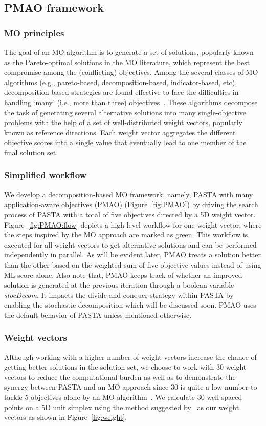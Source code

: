 \subsection{PMAO framework}
\subsubsection{MO principles}
The goal of an MO algorithm is to generate a set of solutions, popularly known as the Pareto-optimal solutions in the MO literature, which represent the best compromise among the (conflicting) objectives. 
Among the several classes of MO algorithms (e.g., pareto-based, decomposition-based, indicator-based, etc), decomposition-based strategies are found effective to face the difficulties in handling `many' (i.e., more than three) objectives~\cite{li2015many}. These algorithms decompose the task of generating several alternative solutions into many single-objective problems with the help of a set of well-distributed weight vectors, popularly known as reference directions. Each weight vector aggregates the different objective scores into a single value that eventually lead to one member of the final solution set.

\subsubsection{Simplified workflow}
We develop a decomposition-based MO framework, namely, PASTA with many application-aware objectives (PMAO) (Figure~\ref{fig:PMAO}) by driving the search process of PASTA with a total of five objectives directed by a 5D weight vector. Figure~\ref{fig:PMAO:flow} depicts a high-level workflow for one weight vector, where the steps inspired by the MO approach are marked as green. This workflow is executed for all weight vectors to get alternative solutions and can be performed independently in parallel. As will be evident later, PMAO treats a solution better than the other based on the weighted-sum of five objective values instead of using ML score alone. Also note that, PMAO keeps track of whether an improved solution is generated at the previous iteration through a boolean variable \textit{stocDecom}. It impacts the divide-and-conquer strategy within PASTA by enabling the stochastic decomposition which will be discussed soon. PMAO uses the default behavior of PASTA unless mentioned otherwise.

\subsubsection{Weight vectors}
Although working with a higher number of weight vectors increase the chance of getting better solutions in the solution set, we choose to work with 30 weight vectors to reduce the computational burden as well as to demonstrate the synergy between PASTA and an MO approach since 30 is quite a low number to tackle 5 objectives alone by an MO algorithm~\cite{deb2014evolutionary}. We calculate 30 well-spaced points on a 5D unit simplex using the method suggested by~\cite{ref_dirs_energy} as our weight vectors as shown in Figure~\ref{fig:weight}. %

